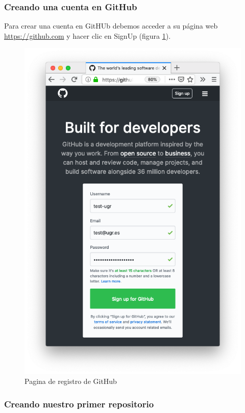 \subsubsection{Creando una cuenta en GitHub}

Para crear una cuenta en GitHUb debemos acceder a su página web \url{https://github.com} y hacer clic en SignUp (figura \ref{fig:git1}).

\begin{figure}[H]
\centering
\includegraphics[width=1.0\textwidth]{../images/git1}
\caption{Pagina de registro de GitHub}
\label{fig:git1}
\end{figure}

\subsubsection{Creando nuestro primer repositorio}

